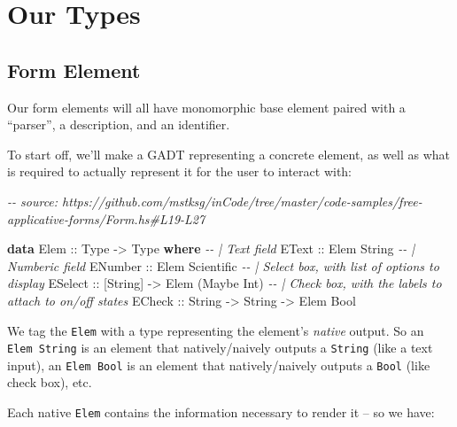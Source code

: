 \documentclass[]{article}
\newenvironment{Shaded}{}{}
\newcommand{\CommentTok}[1]{\textcolor[rgb]{0.38,0.63,0.69}{\textit{#1}}}
\newcommand{\DataTypeTok}[1]{\textcolor[rgb]{0.56,0.13,0.00}{#1}}
\newcommand{\KeywordTok}[1]{\textcolor[rgb]{0.00,0.44,0.13}{\textbf{#1}}}
\newcommand{\NormalTok}[1]{#1}
\newcommand{\OtherTok}[1]{\textcolor[rgb]{0.00,0.44,0.13}{#1}}
\begin{document}
\section{Our Types}\label{our-types}

\subsection{Form Element}\label{form-element}

Our form elements will all have monomorphic base element paired with a
``parser'', a description, and an identifier.

To start off, we'll make a GADT representing a concrete element, as well as what
is required to actually represent it for the user to interact with:

\begin{Shaded}
\begin{Highlighting}[]
\CommentTok{{-}{-} source: https://github.com/mstksg/inCode/tree/master/code{-}samples/free{-}applicative{-}forms/Form.hs\#L19{-}L27}

\KeywordTok{data} \DataTypeTok{Elem}\OtherTok{ ::} \DataTypeTok{Type} \OtherTok{{-}\textgreater{}} \DataTypeTok{Type} \KeywordTok{where}
    \CommentTok{{-}{-} | Text field}
    \DataTypeTok{EText}\OtherTok{   ::} \DataTypeTok{Elem} \DataTypeTok{String}
    \CommentTok{{-}{-} | Numberic field}
    \DataTypeTok{ENumber}\OtherTok{ ::} \DataTypeTok{Elem} \DataTypeTok{Scientific}
    \CommentTok{{-}{-} | Select box, with list of options to display}
    \DataTypeTok{ESelect}\OtherTok{ ::}\NormalTok{ [}\DataTypeTok{String}\NormalTok{] }\OtherTok{{-}\textgreater{}} \DataTypeTok{Elem}\NormalTok{ (}\DataTypeTok{Maybe} \DataTypeTok{Int}\NormalTok{)}
    \CommentTok{{-}{-} | Check box, with the labels to attach to on/off states}
    \DataTypeTok{ECheck}\OtherTok{  ::} \DataTypeTok{String} \OtherTok{{-}\textgreater{}} \DataTypeTok{String} \OtherTok{{-}\textgreater{}} \DataTypeTok{Elem} \DataTypeTok{Bool}
\end{Highlighting}
\end{Shaded}

We tag the \texttt{Elem} with a type representing the element's \emph{native}
output. So an \texttt{Elem\ String} is an element that natively/naively outputs
a \texttt{String} (like a text input), an \texttt{Elem\ Bool} is an element that
natively/naively outputs a \texttt{Bool} (like check box), etc.

Each native \texttt{Elem} contains the information necessary to render it -- so
we have:
\end{document}
